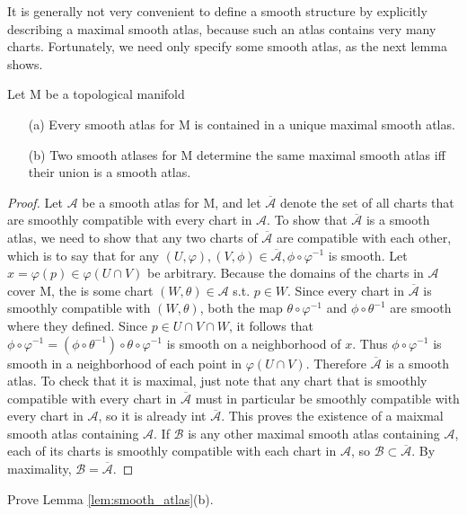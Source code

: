 It is generally not very convenient to define a smooth structure by explicitly describing a
maximal smooth atlas, because such an atlas contains very many charts. Fortunately, we need
only specify some smooth atlas, as the next lemma shows.
\begin{lem}\label{lem:smooth_atlas}
Let M be a topological manifold
\begin{enumerate}
\item[(a)] Every smooth atlas for M is contained in a unique maximal smooth atlas.
\item[(b)] Two smooth atlases for M determine the same maximal smooth atlas iff their union is
a smooth atlas.
\end{enumerate}
\end{lem}
\begin{proof}
Let $\mathcal{A}$ be a smooth atlas for M, and let $\overline{\mathcal{A}}$ denote the 
set of all charts that are smoothly compatible with every chart in $\mathcal{A}$. To 
show that $\overline{\mathcal{A}}$ is a smooth atlas, we need to show that any two
charts of $\overline{\mathcal{A}}$ are compatible with each other, which is to say that
for any $(U,\varphi),(V,\phi)\in \overline{\mathcal{A}}, \phi\circ\varphi^{-1}$ is
smooth. Let $x=\varphi(p)\in \varphi(U\cap V)$ be arbitrary. Because the domains of the
charts in $\mathcal{A}$ cover M, the is some chart $(W,\theta)\in \mathcal{A}$ s.t. 
$p\in W$. Since every chart in $\overline{\mathcal{A}}$ is smoothly compatible with 
$(W,\theta)$, both the map $\theta\circ\varphi^{-1}$ and $\phi\circ\theta^{-1}$ are 
smooth where they defined. Since $p\in U\cap V \cap W$, it follows that $\phi\circ\varphi^{-1}
=(\phi\circ\theta^{-1})\circ\theta\circ\varphi^{-1}$ is smooth on a neighborhood of $x$.
Thus $\phi\circ\varphi^{-1}$ is smooth in a neighborhood of each point in $\varphi(U\cap V)$.
Therefore $\overline{\mathcal{A}}$ is a smooth atlas. To check that it is maximal, just
note that any chart that is smoothly compatible with every chart in $\overline{\mathcal{A}}$
must in particular be smoothly compatible with every chart in $\mathcal{A}$, so it is already
int $\overline{\mathcal{A}}$. This proves the existence of a maixmal smooth atlas containing
$\mathcal{A}$. If $\mathcal{B}$ is any other maximal smooth atlas containing $\mathcal{A}$,
each of its charts is smoothly compatible with each chart in $\mathcal{A}$, so $\mathcal{B}\subset
\overline{\mathcal{A}}$. By maximality, $\mathcal{B}=\overline{\mathcal{A}}$.
\end{proof}
\begin{exer}
Prove Lemma \ref{lem:smooth_atlas}(b).
\end{exer}
